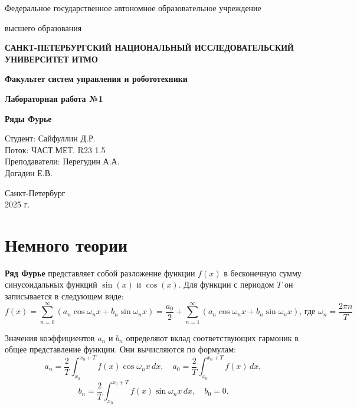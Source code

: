 \documentclass[a4paper]{article}
\begin{document}
\begin{titlepage}
    \centering
    {\large Федеральное государственное автономное образовательное учреждение\par}
    {\large высшего образования\par}
    {\bfseries САНКТ-ПЕТЕРБУРГСКИЙ НАЦИОНАЛЬНЫЙ ИССЛЕДОВАТЕЛЬСКИЙ УНИВЕРСИТЕТ ИТМО\par}
    {\bfseries Факультет систем управления и робототехники\par}
    \vfill
    {\Large \bfseries Лабораторная работа №1\par}
    {\Large \bfseries Ряды Фурье\par}
    \vfill
    
    \begin{flushright}
        Студент: Сайфуллин Д.Р. \\
        Поток: ЧАСТ.МЕТ. R23 1.5 \\
        Преподаватели: Перегудин А.А.\\
        Догадин  Е.В.
    \end{flushright}
    \vfill
    Санкт-Петербург \\ 2025 г.
\end{titlepage}

\tableofcontents
\newpage

\section*{Немного теории}

\textbf{Ряд Фурье} представляет собой разложение функции $f(x)$ в бесконечную сумму синусоидальных функций $\sin(x)$ и $\cos(x)$. Для функции с периодом $T$ он записывается в следующем виде:
$$f(x) = \sum_{n=0}^{\infty} \left( a_n\cos\omega_nx + b_n\sin\omega_nx \right) = \frac{a_0}{2} + \sum_{n=1}^{\infty} \left( a_n\cos\omega_nx + b_n\sin\omega_nx \right)\text{, где }\omega_n = \frac{2\pi n}{T}$$

Значения коэффициентов $a_n$ и $b_n$ определяют вклад соответствующих гармоник в общее представление функции. Они вычисляются по формулам:
$$a_n = \frac{2}{T}\int_{x_0}^{x_0+T} f(x)\cos\omega_nx\,dx, \quad a_0 = \frac{2}{T}\int_{x_0}^{x_0+T} f(x)\,dx,$$
$$b_n = \frac{2}{T}\int_{x_0}^{x_0+T} f(x)\sin\omega_nx\,dx, \quad b_0 = 0.$$
\end{document}
